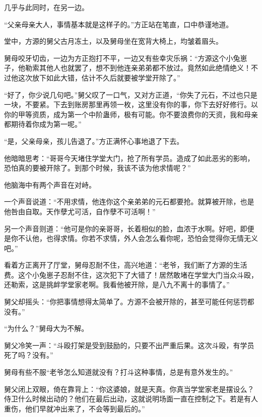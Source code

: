 
\begin{this_body}



几乎与此同时，在另一边。

“父亲母亲大人，事情基本就是这样子的。”方正站在笔直，口中恭谨地道。

堂中，方源的舅父古月冻土，以及舅母坐在宽背大椅上，均皱着眉头。

舅母咬牙切齿，一边为方正抱打不平，一边又有些幸灾乐祸：“方源这个小兔崽子，他勒索其他人也就罢了，想不到他连亲弟弟都不放过。竟然如此绝情绝义！不过他这次放下如此大错，估计不久后就要被学堂开除了。”

“好了，你少说几句吧。”舅父叹了一口气，又对方正道，“你失了元石，不过也只是一块，不要紧。下去到账房那里再领一枚，这里没有你的事，你下去好好修行。以你的甲等资质，成为第一个中阶蛊师，极有可能。你不要浪费你的天资，我和母亲都期待着你成为第一呢。”

“是，父亲母亲，孩儿告退了。”方正满怀心事地退了下去。

他暗暗思考：“哥哥今天堵住学堂大门，抢了所有学员。造成了如此恶劣的影响，恐怕真的要被开除了。到那个时候，我该不该为他求情呢？”

他脑海中有两个声音在对峙。

一个声音说道：“不用求情，他连你这个亲弟弟的元石都要抢。就算被开除，也是他咎由自取。天作孽尤可活，自作孽不可活啊！”

另一个声音则道：“他可是你的亲哥哥，长着相似的脸，血浓于水啊。好吧，即便是你不认他，也得求情。你若不求情，外人会怎么看你呢，恐怕会觉得你无情无义吧。”

看着方正离开了厅堂，舅母忍耐不住，高兴地道：“老爷，我们断了方源的生活费。这个小兔崽子忍耐不住，这次犯下了大错了！居然敢堵在学堂大门当众斗殴，还勒索，这是挑衅学堂家老啊。我看他被开除，是八九不离十的事情了。”

舅父却摇头：“你把事情想得太简单了。方源不会被开除的，甚至可能任何惩罚都没有。”

“为什么？”舅母大为不解。

舅父冷笑一声：“斗殴打架是受到鼓励的，只要不出严重后果。这次斗殴，有学员死了吗？没有。”

舅母有些不服“老爷怎么知道就没有？打斗这种事情，总是有意外发生的。”

舅父闭上双眼，倚在靠背上：“你这婆娘，就是天真。你真当学堂家老是摆设么？侍卫什么时候出动的？他们在最后出动，这就说明场面一直在控制之下。若是有人重伤，他们早就冲出来了，不会等到最后的。”


\end{this_body}
